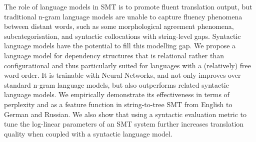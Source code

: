 The role of language models in SMT is to promote fluent translation output, but traditional n-gram language models are unable to capture fluency phenomena between distant words, such as some morphological agreement phenomena, subcategorisation, and syntactic collocations with string-level gaps. Syntactic language models have the potential to fill this modelling gap. We propose a language model for dependency structures that is relational rather than configurational and thus particularly suited for languages with a (relatively) free word order. It is trainable with Neural Networks, and not only improves over standard n-gram language models, but also outperforms related syntactic language models. We empirically demonstrate its effectiveness in terms of perplexity and as a feature function in string-to-tree SMT from English to German and Russian. We also show that using a syntactic evaluation metric to tune the log-linear parameters of an SMT system further increases translation quality when coupled with a syntactic language model.
